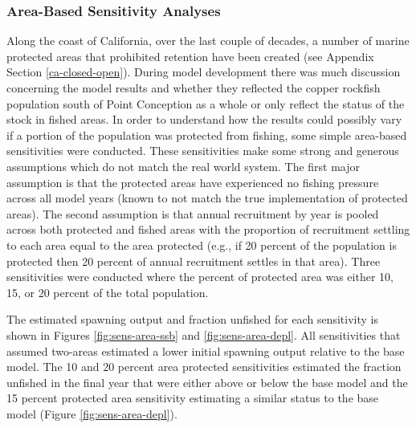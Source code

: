 \documentclass[11pt,
  english,
  a4paper,
]{article}
\begin{document}
\leavevmode\tagmcend\tagstructend\par


\hypertarget{area-based-sensitivity-analyses}{%
\subsubsection{Area-Based Sensitivity Analyses}\label{area-based-sensitivity-analyses}}

\leavevmode\tagmcend\tagstructend


Along the coast of California, over the last couple of decades, a number of marine protected areas that prohibited retention have been created (see Appendix Section \ref{ca-closed-open}). During model development there was much discussion concerning the model results and whether they reflected the copper rockfish population south of Point Conception as a whole or only reflect the status of the stock in fished areas. In order to understand how the results could possibly vary if a portion of the population was protected from fishing, some simple area-based sensitivities were conducted. These sensitivities make some strong and generous assumptions which do not match the real world system. The first major assumption is that the protected areas have experienced no fishing pressure across all model years (known to not match the true implementation of protected areas). The second assumption is that annual recruitment by year is pooled across both protected and fished areas with the proportion of recruitment settling to each area equal to the area protected (e.g., if 20 percent of the population is protected then 20 percent of annual recruitment settles in that area). Three sensitivities were conducted where the percent of protected area was either 10, 15, or 20 percent of the total population.

\leavevmode\tagmcend\tagstructend\par


The estimated spawning output and fraction unfished for each sensitivity is shown in Figures \ref{fig:sens-area-ssb} and \ref{fig:sens-area-depl}. All sensitivities that assumed two-areas estimated a lower initial spawning output relative to the base model. The 10 and 20 percent area protected sensitivities estimated the fraction unfished in the final year that were either above or below the base model and the 15 percent protected area sensitivity estimating a similar status to the base model (Figure \ref{fig:sens-area-depl}).
\end{document}
